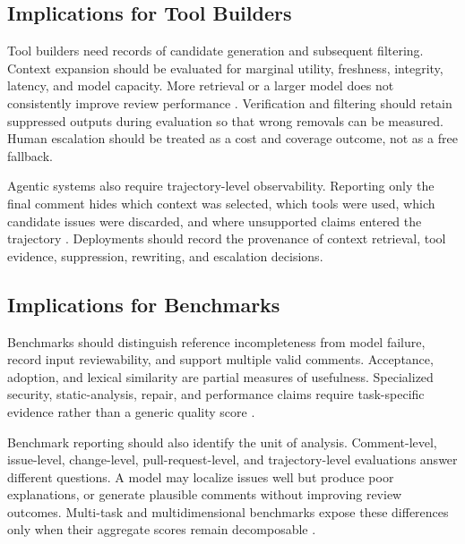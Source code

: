 \documentclass[10pt]{article}
\begin{document}
\subsection{Implications for Tool Builders}

Tool builders need records of candidate generation and subsequent filtering. Context expansion should be evaluated for marginal utility, freshness, integrity, latency, and model capacity. More retrieval or a larger model does not consistently improve review performance \cite{p83_kumar2026_bigger_isn_t_always_better_a_c,p93_meng2025_when_more_retrieval_hurts_retr}. Verification and filtering should retain suppressed outputs during evaluation so that wrong removals can be measured. Human escalation should be treated as a cost and coverage outcome, not as a free fallback.

Agentic systems also require trajectory-level observability. Reporting only the final comment hides which context was selected, which tools were used, which candidate issues were discarded, and where unsupported claims entered the trajectory \cite{p74_charoenwet2026_agentic_code_review_in_the_ter,p76_wang2026_swe_review_closing_the_loop_on,p85_zhang2026_reporeviewer_a_local_first_mul}. Deployments should record the provenance of context retrieval, tool evidence, suppression, rewriting, and escalation decisions.

\subsection{Implications for Benchmarks}

Benchmarks should distinguish reference incompleteness from model failure, record input reviewability, and support multiple valid comments. Acceptance, adoption, and lexical similarity are partial measures of usefulness. Specialized security, static-analysis, repair, and performance claims require task-specific evidence rather than a generic quality score \cite{p04_kumar2026_swe_prbench,p21_peng2025_icodereviewer,p22_jaoua2025_static_analyzers,p46_zhou2025_vulnerability_repair}.

Benchmark reporting should also identify the unit of analysis. Comment-level, issue-level, change-level, pull-request-level, and trajectory-level evaluations answer different questions. A model may localize issues well but produce poor explanations, or generate plausible comments without improving review outcomes. Multi-task and multidimensional benchmarks expose these differences only when their aggregate scores remain decomposable \cite{p91_zhang2026_sphinx_benchmarking_and_modeli,p98_yu2025_fine_tuning_llms_to_analyze_mu}.
\end{document}
